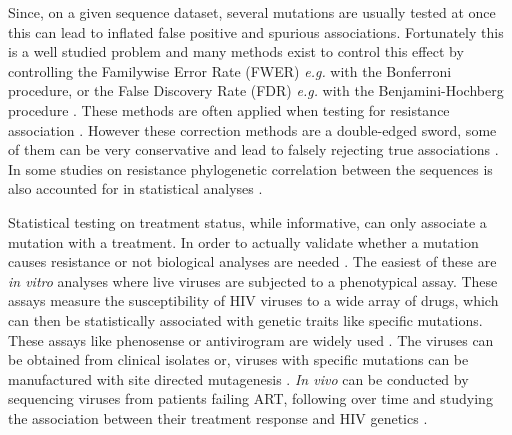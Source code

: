 \documentclass[
  11pt,
  twoside]{scrbook}
\begin{document}
Since, on a given sequence dataset, several mutations are usually tested at once this can lead to inflated false positive \autocite{brownMethodsCorrectingMultiple1997} and spurious \autocite{austinTestingMultipleStatistical2006} associations. Fortunately this is a well studied problem and many methods exist to control this effect by controlling the Familywise Error Rate (FWER) \emph{e.g.} with the Bonferroni procedure,\autocite{hochbergMultipleComparisonProcedures1987} or the False Discovery Rate (FDR) \emph{e.g.} with the Benjamini-Hochberg procedure \autocite{benjaminiControllingFalseDiscovery1995}. These methods are often applied when testing for resistance association \autocite{villabona-arenasIndepthAnalysisHIV12016,gonzalesExtendedSpectrumHIV12003,seoigheModelDirectionalSelection2007}. However these correction methods are a double-edged sword, some of them can be very conservative and lead to falsely rejecting true associations \autocite{shamStatisticalPowerSignificance2014}. In some studies on resistance phylogenetic correlation between the sequences is also accounted for in statistical analyses \autocite{alizonPhylogeneticApproachReveals2010,flynnDeepSequencingProtease2015}.

Statistical testing on treatment status, while informative, can only associate a mutation with a treatment. In order to actually validate whether a mutation causes resistance or not biological analyses are needed \autocite{johnsonUpdateDrugResistance2016,wensing2019UpdateDrug2019}. The easiest of these are \emph{in vitro} analyses where live viruses are subjected to a phenotypical assay. These assays measure the susceptibility of HIV viruses to a wide array of drugs, which can then be statistically associated with genetic traits like specific mutations. These assays like phenosense \autocite{petropoulosNovelPhenotypicDrug2000} or antivirogram \autocite{hertogsRapidMethodSimultaneous1998} are widely used \autocite{heilek-snyderRoleHIVPhenotypic2002,moyleEpidemiologyPredictiveFactors2005,gartlandSusceptibilityGlobalHIV12021}. The viruses can be obtained from clinical isolates \autocite{masquelierGenotypicPhenotypicResistance2001} or, viruses with specific mutations can be manufactured with site directed mutagenesis \autocite{larderMultipleMutationsHIV11989,devreeseResistanceHumanImmunodeficiency1992}. \emph{In vivo} can be conducted by sequencing viruses from patients failing ART, following over time and studying the association between their treatment response and HIV genetics \autocite{tambuyzerEffectMutationsPosition2011,katzensteinPhenotypicSusceptibilityVirological2003}.
\end{document}
